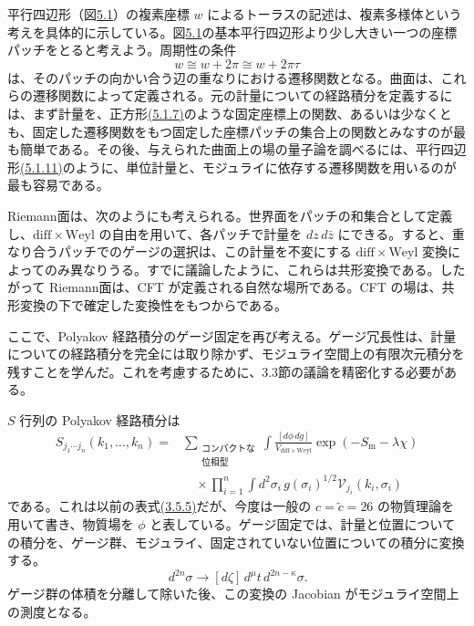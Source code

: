 平行四辺形（図\hyperref[fig:5.1]{5.1}）の複素座標 $w$ によるトーラスの記述は、複素多様体という考えを具体的に示している。図\hyperref[fig:5.1]{5.1}の基本平行四辺形より少し大きい一つの座標パッチをとると考えよう。周期性の条件
\begin{equation}
w\cong w+2\pi\cong w+2\pi\tau
\tag{5.2.16}\label{eq:5.2.16}
\end{equation}
は、そのパッチの向かい合う辺の重なりにおける遷移関数となる。曲面は、これらの遷移関数によって定義される。元の計量についての経路積分を定義するには、まず計量を、正方形\hyperref[eq:5.1.7]{(5.1.7)}のような固定座標上の関数、あるいは少なくとも、固定した遷移関数をもつ固定した座標パッチの集合上の関数とみなすのが最も簡単である。その後、与えられた曲面上の場の量子論を調べるには、平行四辺形\hyperref[eq:5.1.11]{(5.1.11)}のように、単位計量と、モジュライに依存する遷移関数を用いるのが最も容易である。

Riemann面は、次のようにも考えられる。世界面をパッチの和集合として定義し、$\mathrm{diff}\times\mathrm{Weyl}$ の自由を用いて、各パッチで計量を $dz\,d\bar z$ にできる。すると、重なり合うパッチでのゲージの選択は、この計量を不変にする $\mathrm{diff}\times\mathrm{Weyl}$ 変換によってのみ異なりうる。すでに議論したように、これらは共形変換である。したがって Riemann面は、CFT が定義される自然な場所である。CFT の場は、共形変換の下で確定した変換性をもつからである。

\label{sec:5.3}

ここで、Polyakov 経路積分のゲージ固定を再び考える。ゲージ冗長性は、計量についての経路積分を完全には取り除かず、モジュライ空間上の有限次元積分を残すことを学んだ。これを考慮するために、3.3節の議論を精密化する必要がある。

$S$ 行列の Polyakov 経路積分は
\begin{equation}
\begin{aligned}
S_{j_1\cdots j_n}(k_1,\ldots,k_n)
={}&\sum_{\substack{\text{コンパクトな}\\\text{位相型}}}
\int\frac{[d\phi\,dg]}{V_{\mathrm{diff}\times\mathrm{Weyl}}}
\exp(-S_{\mathrm m}-\lambda\chi)\\
&\quad\times\prod_{i=1}^n
\int d^2\sigma_i\,g(\sigma_i)^{1/2}
\mathcal V_{j_i}(k_i,\sigma_i)
\end{aligned}
\tag{5.3.1}\label{eq:5.3.1}
\end{equation}
である。これは以前の表式\hyperref[eq:3.5.5]{(3.5.5)}だが、今度は一般の $c=\tilde c=26$ の物質理論を用いて書き、物質場を $\phi$ と表している。ゲージ固定では、計量と位置についての積分を、ゲージ群、モジュライ、固定されていない位置についての積分に変換する。
\begin{equation}
[dg]\,d^{2n}\sigma\longrightarrow[d\zeta]\,d^\mu t\,d^{2n-\kappa}\sigma.
\tag{5.3.2}\label{eq:5.3.2}
\end{equation}
ゲージ群の体積を分離して除いた後、この変換の Jacobian がモジュライ空間上の測度となる。

